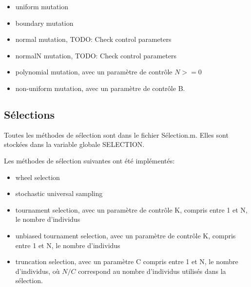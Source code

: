 \documentclass[12pt, letterpaper]{article}
\begin{document}
\begin{itemize}
\item uniform mutation\\
  
\item boundary mutation\\
  
\item normal mutation, TODO: Check control parameters\\
  
\item normalN mutation, TODO: Check control parameters\\
  
\item polynomial mutation, avec un paramètre de contrôle $N >= 0$\\
  
\item non-uniform mutation, avec un paramètre de contrôle B.\\
\end{itemize}

\subsection{Sélections}

Toutes les méthodes de sélection sont dans le fichier Sélection.m.
Elles sont stockées dans la variable globale SELECTION.

Les méthodes de sélection suivantes ont été implémentés:

\begin{itemize}
  
\item wheel selection\\
	
\item stochastic universal sampling\\
	
\item tournament selection, avec un paramètre de contrôle K, compris
  entre 1 et N, le nombre d'individus\\
	
\item unbiased tournament selection, avec un paramètre de contrôle K,
  compris entre 1 et N, le nombre d'individus\\
	
\item truncation selection, avec un paramètre C compris entre 1 et N,
  le nombre d'individus, où $N/C$ correspond au nombre d'individus
  utilisés dans la sélection.\\
\end{itemize}
\end{document}
